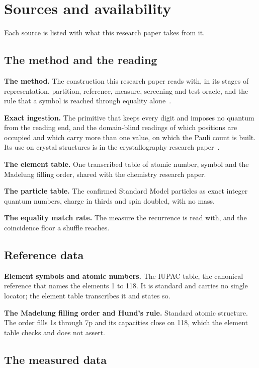 \chapter{Sources and availability}

Each source is listed with what this research paper takes from it.

\section*{The method and the reading}

\textbf{The method.} The construction this research paper reads with, in its stages of
representation, partition, reference, measure, screening and test oracle, and the rule that a symbol
is reached through equality alone~\cite{src:Quigg-orior-workbook}.

\textbf{Exact ingestion.} The primitive that keeps every digit and imposes no quantum from the reading
end, and the domain-blind readings of which positions are occupied and which carry more than one
value, on which the Pauli count is built. Its use on crystal structures is in the crystallography
research paper~\cite{src:Quigg-crystallography}.

\textbf{The element table.} One transcribed table of atomic number, symbol and the Madelung filling
order, shared with the chemistry research paper.

\textbf{The particle table.} The confirmed Standard Model particles as exact integer quantum numbers,
charge in thirds and spin doubled, with no mass.

\textbf{The equality match rate.} The measure the recurrence is read with, and the coincidence floor a
shuffle reaches.

\section*{Reference data}

\textbf{Element symbols and atomic numbers.} The IUPAC table, the canonical reference that names the
elements 1 to 118. It is standard and carries no single locator; the element table transcribes it and
states so.

\textbf{The Madelung filling order and Hund's rule.} Standard atomic structure. The order fills 1s
through 7p and its capacities close on 118, which the element table checks and does not assert.

\section*{The measured data}

